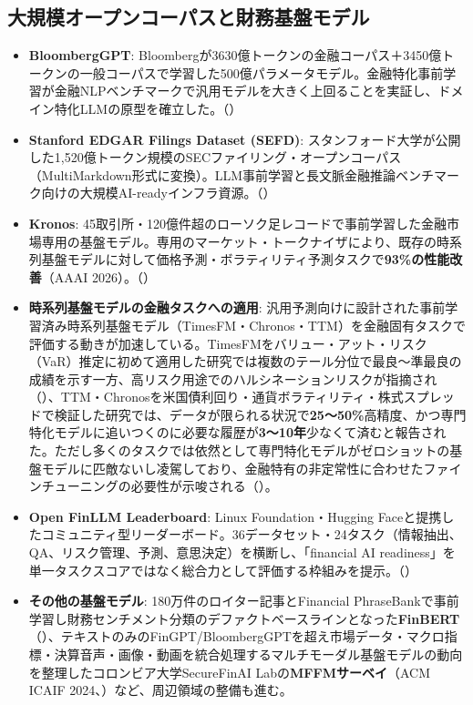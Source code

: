 \subsection{大規模オープンコーパスと財務基盤モデル}

\begin{itemize}
  \item \textbf{BloombergGPT}: Bloombergが3630億トークンの金融コーパス＋3450億トークンの一般コーパスで学習した500億パラメータモデル。金融特化事前学習が金融NLPベンチマークで汎用モデルを大きく上回ることを実証し、ドメイン特化LLMの原型を確立した。（\cite{bloomberggpt2023}）
  \item \textbf{Stanford EDGAR Filings Dataset (SEFD)}: スタンフォード大学が公開した1,520億トークン規模のSECファイリング・オープンコーパス（MultiMarkdown形式に変換）。LLM事前学習と長文脈金融推論ベンチマーク向けの大規模AI-readyインフラ資源。（\cite{stanfordedgar2026}）
  \item \textbf{Kronos}: 45取引所・120億件超のローソク足レコードで事前学習した金融市場専用の基盤モデル。専用のマーケット・トークナイザにより、既存の時系列基盤モデルに対して価格予測・ボラティリティ予測タスクで\textbf{93\%の性能改善}（AAAI 2026）。（\cite{kronos2025}）
  \item \textbf{時系列基盤モデルの金融タスクへの適用}: 汎用予測向けに設計された事前学習済み時系列基盤モデル（TimesFM・Chronos・TTM）を金融固有タスクで評価する動きが加速している。TimesFMをバリュー・アット・リスク（VaR）推定に初めて適用した研究では複数のテール分位で最良〜準最良の成績を示す一方、高リスク用途でのハルシネーションリスクが指摘され（\cite{tsfmvar2024}）、TTM・Chronosを米国債利回り・通貨ボラティリティ・株式スプレッドで検証した研究では、データが限られる状況で\textbf{25〜50\%}高精度、かつ専門特化モデルに追いつくのに必要な履歴が\textbf{3〜10年}少なくて済むと報告された。ただし多くのタスクでは依然として専門特化モデルがゼロショットの基盤モデルに匹敵ないし凌駕しており、金融特有の非定常性に合わせたファインチューニングの必要性が示唆される（\cite{tsfmmultivariate2025}）。
  \item \textbf{Open FinLLM Leaderboard}: Linux Foundation・Hugging Faceと提携したコミュニティ型リーダーボード。36データセット・24タスク（情報抽出、QA、リスク管理、予測、意思決定）を横断し、「financial AI readiness」を単一タスクスコアではなく総合力として評価する枠組みを提示。（\cite{finllmleaderboard2025}）
  \item \textbf{その他の基盤モデル}: 180万件のロイター記事とFinancial PhraseBankで事前学習し財務センチメント分類のデファクトベースラインとなった\textbf{FinBERT}（\cite{finbert2020}）、テキストのみのFinGPT/BloombergGPTを超え市場データ・マクロ指標・決算音声・画像・動画を統合処理するマルチモーダル基盤モデルの動向を整理したコロンビア大学SecureFinAI Labの\textbf{MFFMサーベイ}（ACM ICAIF 2024、\cite{mffm2025}）など、周辺領域の整備も進む。
\end{itemize}

